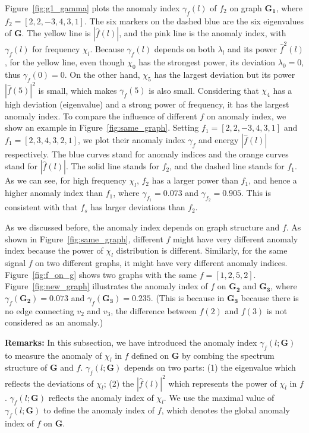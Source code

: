 Figure~\ref{fig:g1_gamma} plots the anomaly index $\gamma_f(l)$ of $f_2$ on graph $\mathbf{G_1}$, where $f_2=[2,2,-3,4,3,1]$. The six markers on the dashed blue are the six eigenvalues of $\mathbf{G}$. The yellow line is $|\hat{f}(l)|$, and the pink line is the anomaly index, with $\gamma_f(l)$ for frequency $\chi_l$. Because $\gamma_f(l)$ depends on both $\lambda_l$ and its power $\hat{f}^2(l)$, for the yellow line, even though $\chi_0$ has the strongest power, its deviation $\lambda_0 = 0$, thus $\gamma_f(0)=0$. On the other hand, $\chi_5$ has the largest deviation but its power $|\hat{f}(5)|^2$ is small, which makes $\gamma_f(5)$ is also small. Considering that $\chi_4$ has a high deviation (eigenvalue) and a strong power of frequency, it has the largest anomaly index. To compare the influence of different $f$ on anomaly index, we show an example in Figure~\ref{fig:same_graph}. Setting $f_1=[2,2,-3,4,3,1]$ and $f_1=[2,3,4,3,2,1]$, we plot their anomaly index $\gamma_{f}$ and energy $|\hat{f}(l)|$ respectively.
The blue curves stand for anomaly indices and the
orange curves stand for $|\hat{f}(l)|$. The solid line stands for $f_2$, and the
dashed line stands for $f_1$. As we can see, for high frequency $\chi_l$, $f_2$ has a larger power than $f_1$, and hence a higher anomaly index than $f_1$, where $\gamma_{f_1}=0.073$ and $\gamma_{f_2}=0.905$. This is consistent with that $f_s$ has larger deviations than $f_2$.

As we discussed before, the anomaly index depends on graph structure and $f$. As shown in Figure~\ref{fig:same_graph}, different $f$ might have very different anomaly index because the power of $\chi_l$ distribution is different. Similarly, for the same signal $f$ on two different graphs, it might have very different anomaly indices. Figure~\ref{fig:f_on_g} shows two graphs with the same $f=[1,2,5,2]$. Figure~\ref{fig:new_graph} illustrates the anomaly index of $f$ on $\mathbf{G_2}$ and $\mathbf{G_3}$, where $\gamma_{f}(\mathbf{G_2})=0.073$ and $\gamma_{f}(\mathbf{G_3})=0.235$. (This is because in $\mathbf{G_3}$ because there is no edge connecting $v_2$ and $v_3$, the difference between $f(2)$ and $f(3)$ is not considered as an anomaly.)


{\textbf{Remarks:}}
In this subsection, we have introduced the anomaly index $\gamma_f(l;\mathbf{G})$ to measure the anomaly of $\chi_l$ in $f$ defined on $\mathbf{G}$ by combing the spectrum structure of $\mathbf{G}$ and $f$. $\gamma_f(l;\mathbf{G})$ depends on two parts: (1) the eigenvalue which reflects the deviations of $\chi_l$; (2) the $|\hat{f}(l)|^2$  which represents the power of $\chi_l$ in $f$. $\gamma_f(l;\mathbf{G})$ reflects the anomaly index of $\chi_l$. We use the maximal value of $\gamma_f(l;\mathbf{G})$ to define the anomaly index of $f$, which denotes the global anomaly index of $f$ on $\mathbf{G}$.



